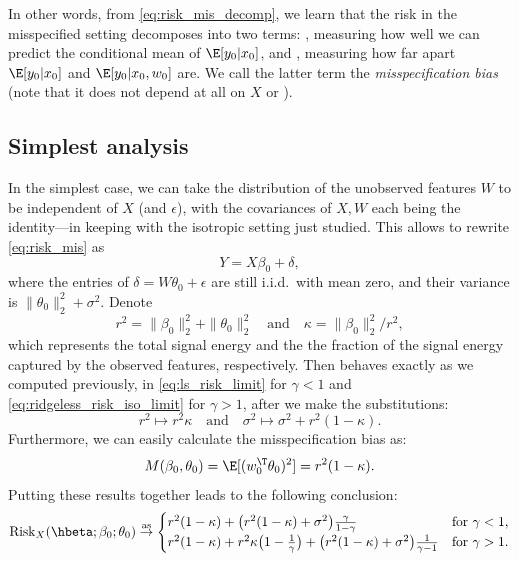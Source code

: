 \documentclass{article}
\begin{document}
In other words, from \eqref{eq:risk_mis_decomp}, we learn that the risk in the
misspecified setting decomposes into two terms: , measuring how well we can predict the conditional mean of
$\E[y_0|x_0]$, and , measuring how far
apart $\E[y_0|x_0]$ and $\E[y_0|x_0,w_0]$ are. We call the latter term the
\emph{misspecification bias} (note that it does not depend at all on $X$ or
\smash{$\hbeta$}).   

\subsection{Simplest analysis}

In the simplest case, we can take the distribution of the unobserved features
$W$ to be independent of $X$ (and $\epsilon$), with the covariances of $X,W$
each being the identity---in keeping with the isotropic setting just
studied. This allows to rewrite \eqref{eq:risk_mis} as 
\[
Y = X\beta_0 + \delta,
\]
where the entries of $\delta = W\theta_0 + \epsilon$ are still i.i.d.\ with mean
zero, and their variance is $\|\theta_0\|_2^2 + \sigma^2$. Denote 
\[
r^2 = \|\beta_0\|_2^2 + \|\theta_0\|_2^2 \quad \text{and} \quad  
\kappa = \|\beta_0\|_2^2 / r^2,
\]
which represents the total signal energy and the the fraction of the signal
energy captured by the observed features, respectively. Then  behaves exactly as we computed previously, in
\eqref{eq:ls_risk_limit} for $\gamma<1$ and \eqref{eq:ridgeless_risk_iso_limit}
for $\gamma>1$, after we make the substitutions:     
\[
r^2 \mapsto r^2 \kappa \quad \text{and} \quad
\sigma^2 \mapsto \sigma^2 + r^2 (1-\kappa).
\]
Furthermore, we can easily calculate the misspecification bias as: 
\[
M(\beta_0, \theta_0) = \E[(w_0^\T \theta_0)^2] = r^2 (1-\kappa). 
\]
Putting these results together leads to the following conclusion:
\begin{equation}
\label{eq:ridgeless_risk_iso_mis_limit}
\Risk_X(\hbeta; \beta_0; \theta_0) \asto 
\begin{cases}
r^2 (1-\kappa) + \big(r^2(1-\kappa) + \sigma^2\big) 
\frac{\gamma}{1-\gamma} & \text{for $\gamma < 1$}, \\
r^2 (1-\kappa) + r^2 \kappa \big(1-\frac{1}{\gamma}\big) 
+ \big(r^2 (1-\kappa) + \sigma^2\big) \frac{1}{\gamma-1} &   
\text{for $\gamma > 1$}.
\end{cases}
\end{equation}
\end{document}
